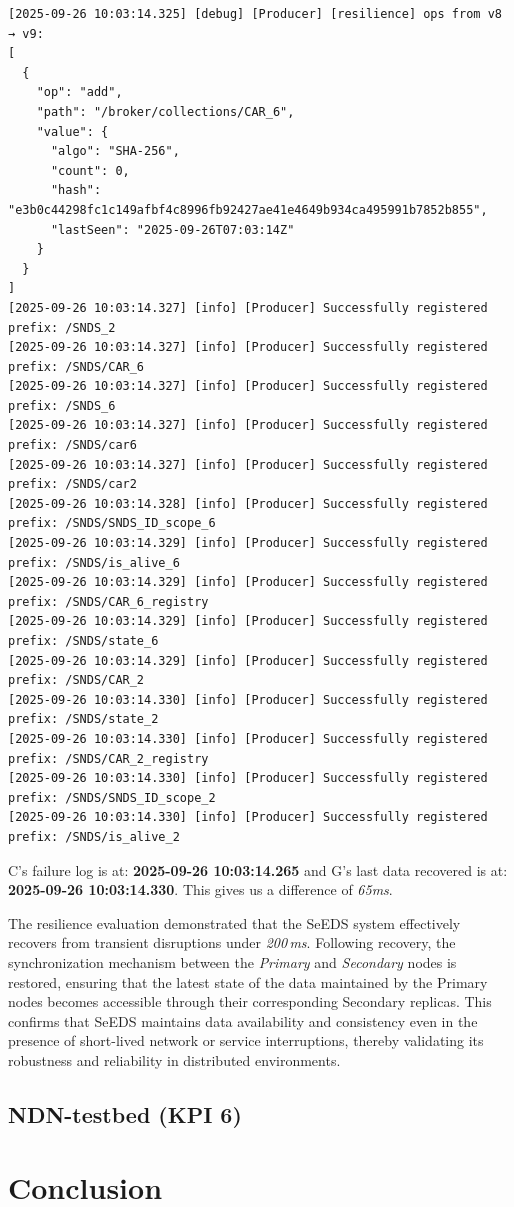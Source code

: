 \documentclass{article}
\begin{document}
\begin{lstlisting}[language=log, caption={Recovery of Node C through Node G}, label={lst:recovery-of-node-c-g}]
[2025-09-26 10:03:14.325] [debug] [Producer] [resilience] ops from v8 → v9:
[
  {
    "op": "add",
    "path": "/broker/collections/CAR_6",
    "value": {
      "algo": "SHA-256",
      "count": 0,
      "hash": "e3b0c44298fc1c149afbf4c8996fb92427ae41e4649b934ca495991b7852b855",
      "lastSeen": "2025-09-26T07:03:14Z"
    }
  }
]
[2025-09-26 10:03:14.327] [info] [Producer] Successfully registered prefix: /SNDS_2
[2025-09-26 10:03:14.327] [info] [Producer] Successfully registered prefix: /SNDS/CAR_6
[2025-09-26 10:03:14.327] [info] [Producer] Successfully registered prefix: /SNDS_6
[2025-09-26 10:03:14.327] [info] [Producer] Successfully registered prefix: /SNDS/car6
[2025-09-26 10:03:14.327] [info] [Producer] Successfully registered prefix: /SNDS/car2
[2025-09-26 10:03:14.328] [info] [Producer] Successfully registered prefix: /SNDS/SNDS_ID_scope_6
[2025-09-26 10:03:14.329] [info] [Producer] Successfully registered prefix: /SNDS/is_alive_6
[2025-09-26 10:03:14.329] [info] [Producer] Successfully registered prefix: /SNDS/CAR_6_registry
[2025-09-26 10:03:14.329] [info] [Producer] Successfully registered prefix: /SNDS/state_6
[2025-09-26 10:03:14.329] [info] [Producer] Successfully registered prefix: /SNDS/CAR_2
[2025-09-26 10:03:14.330] [info] [Producer] Successfully registered prefix: /SNDS/state_2
[2025-09-26 10:03:14.330] [info] [Producer] Successfully registered prefix: /SNDS/CAR_2_registry
[2025-09-26 10:03:14.330] [info] [Producer] Successfully registered prefix: /SNDS/SNDS_ID_scope_2
[2025-09-26 10:03:14.330] [info] [Producer] Successfully registered prefix: /SNDS/is_alive_2 
\end{lstlisting}

C's failure log is at: \textbf{2025-09-26 10:03:14.265} and G's last data recovered is at: \textbf{2025-09-26 10:03:14.330}. This gives us a difference of \textit{65ms}.

The resilience evaluation demonstrated that the SeEDS system effectively recovers from transient disruptions under \emph{200\,ms}. Following recovery, the synchronization mechanism between the \emph{Primary} and \emph{Secondary} nodes is restored, ensuring that the latest state of the data maintained by the Primary nodes becomes accessible through their corresponding Secondary replicas. This confirms that SeEDS maintains data availability and consistency even in the presence of short-lived network or service interruptions, thereby validating its robustness and reliability in distributed environments.




\subsection{NDN-testbed (KPI 6)}
\section{Conclusion}
\end{document}
